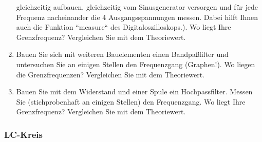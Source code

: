 \documentclass[12pt]{scrartcl}
\begin{document}
\begin{enumerate}
gleichzeitig aufbauen, gleichzeitig vom Sinusgenerator versorgen und für jede Frequenz nacheinander die 4 Ausgangsspannungen messen.
Dabei hilft Ihnen auch die Funktion “measure“ des Digitaloszilloskops.). Wo liegt Ihre Grenzfrequenz? Vergleichen Sie mit dem Theoriewert.
\item
Bauen Sie sich mit weiteren Bauelementen einen Bandpaßfilter und untersuchen Sie an einigen Stellen den Frequenzgang (Graphen!). Wo liegen die Grenzfrequenzen? Vergleichen Sie mit dem Theoriewert.
\item
Bauen Sie mit dem Widerstand und einer Spule ein Hochpassfilter. Messen Sie (stichprobenhaft an einigen Stellen) den Frequenzgang. Wo liegt Ihre Grenzfrequenz? Vergleichen Sie mit dem Theoriewert.
\end{enumerate}
\subsubsection{LC-Kreis}
\end{document}
